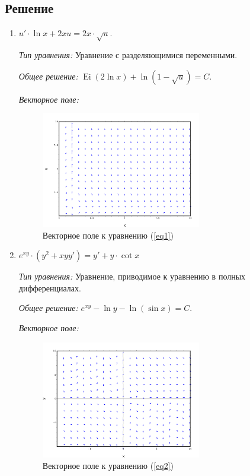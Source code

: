 \documentclass[14pt, a4paper, titlepage, fleqn]{extarticle}
\DeclareMathOperator{\Ei}{Ei}
\begin{document}
        
        \subsection{Решение}
            \begin{enumerate}
                \item 
                \( 
                    u' \cdot \ln{x} + 2xu = 2x \cdot \sqrt{u}.
                \)
                \label{eq1}

                \textit{Тип уравнения:}
                Уравнение с разделяющимися переменными.

                \textit{Общее решение:}
                \( \Ei(2 \ln{x}) + \ln(1 - \sqrt{u}) = C. \)

                \textit{Векторное поле:}

                \begin{figure}[H]
                    \centering
                    \includegraphics[width=7cm]{pictures/vector_field_1.pdf}
                    \caption{Векторное поле к уравнению (\ref{eq1})}
                \end{figure}
                
                \item 
                \( 
                    e^{xy} \cdot \left( y^2 + xyy' \right) = y' + y \cdot \cot{x}
                \)
                \label{eq2}

                \textit{Тип уравнения:}
                Уравнение, приводимое к уравнению в полных дифференциалах.

                \textit{Общее решение:}
                \( e^{xy} - \ln{y} - \ln(\sin{x}) = C. \)

                \textit{Векторное поле:}

                \begin{figure}[H]
                    \centering
                    \includegraphics[width=7cm]{pictures/vector_field_2.pdf}
                    \caption{Векторное поле к уравнению (\ref{eq2})}
                \end{figure}
                

\end{enumerate}
\end{document}
